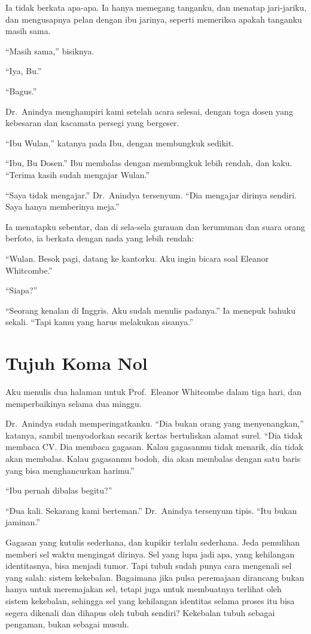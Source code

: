 \documentclass[11pt,twoside,openany]{book}
\begin{document}
Ia tidak berkata apa-apa. Ia hanya memegang tanganku, dan menatap jari-jariku, dan mengusapnya pelan dengan ibu jarinya, seperti memeriksa apakah tanganku masih sama.

``Masih sama,'' bisiknya.

``Iya, Bu.''

``Bagus.''

Dr.~Anindya menghampiri kami setelah acara selesai, dengan toga dosen yang kebesaran dan kacamata persegi yang bergeser.

``Ibu Wulan,'' katanya pada Ibu, dengan membungkuk sedikit.

``Ibu, Bu Dosen.'' Ibu membalas dengan membungkuk lebih rendah, dan kaku. ``Terima kasih sudah mengajar Wulan.''

``Saya tidak mengajar.'' Dr.~Anindya tersenyum. ``Dia mengajar dirinya sendiri. Saya hanya memberinya meja.''

Ia menatapku sebentar, dan di sela-sela gurauan dan kerumunan dan suara orang berfoto, ia berkata dengan nada yang lebih rendah:

``Wulan. Besok pagi, datang ke kantorku. Aku ingin bicara soal Eleanor Whitcombe.''

``Siapa?''

``Seorang kenalan di Inggris. Aku sudah menulis padanya.'' Ia menepuk bahuku sekali. ``Tapi kamu yang harus melakukan sisanya.''

\chapter{Tujuh Koma Nol}
Aku menulis dua halaman untuk Prof.~Eleanor Whitcombe dalam tiga hari, dan memperbaikinya selama dua minggu.

Dr.~Anindya sudah memperingatkanku. ``Dia bukan orang yang menyenangkan,'' katanya, sambil menyodorkan secarik kertas bertuliskan alamat surel. ``Dia tidak membaca CV. Dia membaca gagasan. Kalau gagasanmu tidak menarik, dia tidak akan membalas. Kalau gagasanmu bodoh, dia akan membalas dengan satu baris yang bisa menghancurkan harimu.''

``Ibu pernah dibalas begitu?''

``Dua kali. Sekarang kami berteman.'' Dr.~Anindya tersenyum tipis. ``Itu bukan jaminan.''

Gagasan yang kutulis sederhana, dan kupikir terlalu sederhana. Jeda pemulihan memberi sel waktu mengingat dirinya. Sel yang lupa jadi apa, yang kehilangan identitasnya, bisa menjadi tumor. Tapi tubuh sudah punya cara mengenali sel yang salah: sistem kekebalan. Bagaimana jika pulsa peremajaan dirancang bukan hanya untuk meremajakan sel, tetapi juga untuk membuatnya terlihat oleh sistem kekebalan, sehingga sel yang kehilangan identitas selama proses itu bisa segera dikenali dan dihapus oleh tubuh sendiri? Kekebalan tubuh sebagai pengaman, bukan sebagai musuh.
\end{document}
